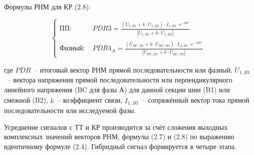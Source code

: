 
Формулы РНМ для КР (2.8):

\begin{equation}
\label{eq:ch02_pdr_kr}
\left\{
\begin{aligned}
\text{ПП: } & \dot{PDR3} = \frac{(\dot{U}_{1,B1} + k \cdot \dot{U}_{1,B2}) \cdot \bar{\dot{I}}_{1,B1} \cdot e^{-90^\circ}}{|\dot{U}_{1,B1} + k \cdot \dot{U}_{1,B2}|} \\
\text{Фазный: } & \dot{PDR4}_A = \frac{(\dot{U}_{BC,B1} + k \cdot \dot{U}_{BC,B2}) \cdot \bar{\dot{I}}_{A,B1} \cdot e^{-180^\circ}}{|\dot{U}_{BC,B1} + k \cdot \dot{U}_{BC,B2}|}
\end{aligned}
\right.
\end{equation}


где $\dot{PDR}$~-- итоговый вектор РНМ прямой последовательности или фазный,
$\dot{U}_{1,B1}$~-- вектора напряжения прямой последовательности или перпендикулярного
линейного напряжения (BC для фазы А) для данной секции шин (B1) или смежной (B2), $k$~--
коэффициент связи, $\bar{\dot{I}}_{1,B1}$~-- сопряжённый вектор тока прямой
последовательности или исследуемой фазы.

Усреднение сигналов с ТТ и КР производится за счёт сложения выходных комплексных
значений векторов РНМ, формулы (2.7) и (2.8) по выражению идентичному формуле (2.4).
Гибридный сигнал формируется в четыре этапа.

